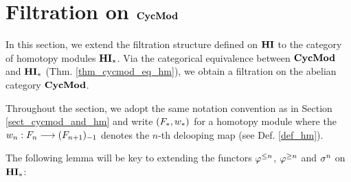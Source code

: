 \newpage
\section{Filtration on $\mathbf{CycMod}$}\label{sect_filtration_cycmod}

In this section, we extend the filtration structure defined on 
$\mathbf{HI}$ to the category of homotopy modules $\mathbf{HI}_*$. Via the 
categorical equivalence between $\mathbf{CycMod}$ and $\mathbf{HI}_*$ (Thm. 
\ref{thm_cycmod_eq_hm}), we obtain a filtration on the abelian 
category $\mathbf{CycMod}$.

Throughout the section, we adopt the same notation convention as 
in Section \ref{sect_cycmod_and_hm} and write $(F_*, w_*)$ 
for a homotopy module where the $w_n: F_{n} \longrightarrow 
(F_{n + 1})_{-1}$ denotes the $n$-th delooping map (see Def. 
\ref{def_hm}).

The following lemma will be key to extending the functors 
$\varphi^{\leq n}$, $\varphi^{\geq n}$ and $\sigma^{n}$ on $\mathbf{HI}_*$:

